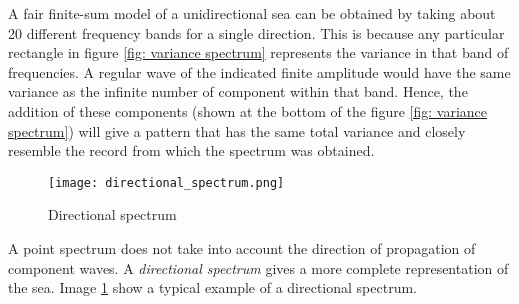 A fair finite-sum model of a unidirectional sea can be obtained by taking about
20 different frequency bands for a single direction. This is because any
particular rectangle in figure \ref{fig: variance spectrum} represents the
variance in that band of frequencies. A regular wave of the indicated finite
amplitude would have the same variance as the infinite number of component
within that band. Hence, the addition of these components (shown at the bottom
of the figure \ref{fig: variance spectrum}) will give a pattern that has the
same total variance and closely resemble the record from which the spectrum was
obtained.

\begin{figure}
  \centering
  \texttt{[image: directional\_spectrum.png]}
  \caption{Directional spectrum}
  \label{fig: directional spectrum}
\end{figure}


A point spectrum does not take into account the direction of propagation of
component waves. A \textit{directional spectrum} gives a more complete
representation of the sea. Image \ref{fig: directional spectrum} show a typical
example of a directional spectrum.


